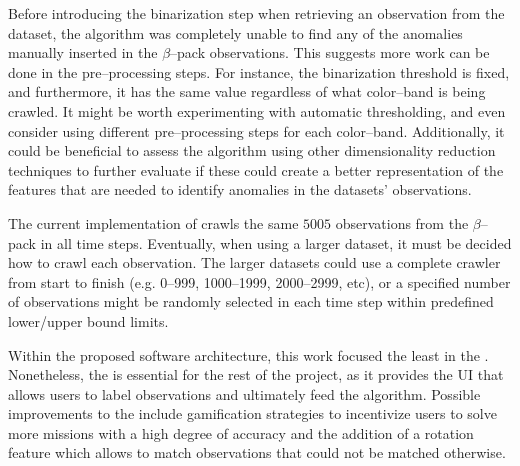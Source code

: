 Before introducing the binarization step when retrieving an observation from the dataset, the \mlblink algorithm was completely unable to find any of the anomalies manually inserted in the $\beta$--pack observations. This suggests more work can be done in the pre--processing steps. For instance, the binarization threshold is fixed, and furthermore, it has the same value regardless of what \panstarrs color--band is being crawled. It might be worth experimenting with automatic thresholding, and even consider using different pre--processing steps for each color--band. Additionally, it could be beneficial to assess the algorithm using other dimensionality reduction techniques to further evaluate if these could create a better representation of the features that are needed to identify anomalies in the datasets' observations. \newline

The current implementation of \mlblink crawls the same $5005$ observations from the $\beta$--pack in all time steps. Eventually, when using a larger dataset, it must be decided how to crawl each observation. The larger datasets could use a complete crawler from start to finish (e.g. 0--999, 1000--1999, 2000--2999, etc), or a specified number of observations might be randomly selected in each time step within predefined lower/upper bound limits. \newline

Within the proposed \vasco software architecture, this work focused the least in the \mlblinkui. Nonetheless, the \mlblinkui is essential for the rest of the project, as it provides the UI that allows users to label observations and ultimately feed the \mlblink algorithm. Possible improvements to the \mlblinkui include gamification strategies to incentivize users to solve more missions with a high degree of accuracy and the addition of a rotation feature which allows to match observations that could not be matched otherwise. \newline